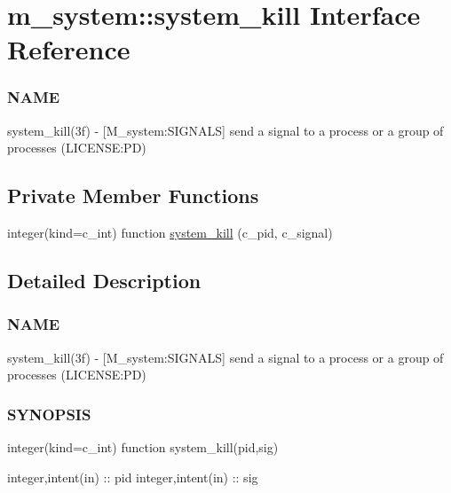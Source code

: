 \hypertarget{interfacem__system_1_1system__kill}{}\section{m\+\_\+system\+:\+:system\+\_\+kill Interface Reference}
\label{interfacem__system_1_1system__kill}


\subsubsection*{N\+A\+ME}

system\+\_\+kill(3f) -\/ \mbox{[}M\+\_\+system\+:S\+I\+G\+N\+A\+LS\mbox{]} send a signal to a process or a group of processes (L\+I\+C\+E\+N\+SE\+:PD)  


\subsection*{Private Member Functions}
\begin{DoxyCompactItemize}
\item 
integer(kind=c\+\_\+int) function \mbox{\hyperlink{interfacem__system_1_1system__kill_a79ff46722f540f931d947f90bdf2c8ea}{system\+\_\+kill}} (c\+\_\+pid, c\+\_\+signal)
\end{DoxyCompactItemize}


\subsection{Detailed Description}
\subsubsection*{N\+A\+ME}

system\+\_\+kill(3f) -\/ \mbox{[}M\+\_\+system\+:S\+I\+G\+N\+A\+LS\mbox{]} send a signal to a process or a group of processes (L\+I\+C\+E\+N\+SE\+:PD) 

\subsubsection*{S\+Y\+N\+O\+P\+S\+IS}

\begin{DoxyVerb}integer(kind=c_int) function system_kill(pid,sig)

   integer,intent(in) :: pid
   integer,intent(in) :: sig
\end{DoxyVerb}


